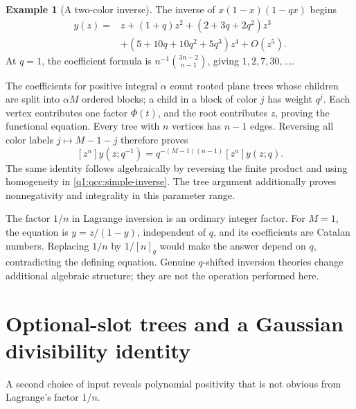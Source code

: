 \documentclass[11pt,a4paper,oneside,openany]{book}
\theoremstyle{definition}
\newtheorem{example}[theorem]{Example}
\theoremstyle{remark}
\begin{document}
\begin{example}[A two-color inverse]\label{q1:qcc:inverse-example}
The inverse of \(x(1-x)(1-qx)\) begins
\begin{align*}
 y(z)={}&z+(1+q)z^2+(2+3q+2q^2)z^3\\
       &+(5+10q+10q^2+5q^3)z^4+O(z^5).
\end{align*}
At \(q=1\), the coefficient formula is
\(n^{-1}\binom{3n-2}{n-1}\), giving \(1,2,7,30,\ldots\).
\end{example}
The coefficients for positive integral \(\alpha\) count rooted plane trees
whose children are split into \(\alpha M\) ordered blocks; a child in a block of
color \(j\) has weight \(q^j\). Each vertex contributes one factor
\(\Phi(t)\), and the root contributes \(z\), proving the functional equation.
Every tree with \(n\) vertices has \(n-1\) edges. Reversing all color labels
\(j\mapsto M-1-j\) therefore proves
\begin{equation}\label{q1:qcc:inverse-reciprocity}
 [z^n]y(z;q^{-1})=q^{-(M-1)(n-1)}[z^n]y(z;q).
\end{equation}
The same identity follows algebraically by reversing the finite product and using
homogeneity in \eqref{q1:qcc:simple-inverse}. The tree argument additionally proves
nonnegativity and integrality in this parameter range.

\begin{auditbox}[title={Ordinary inversion is not obtained by replacing \(n\) with \([n]_q\)}]
The factor \(1/n\) in Lagrange inversion is an ordinary integer factor. For
\(M=1\), the equation is \(y=z/(1-y)\), independent of \(q\), and its
coefficients are Catalan numbers. Replacing \(1/n\) by \(1/[n]_q\) would make
the answer depend on \(q\), contradicting the defining equation. Genuine
\(q\)-shifted inversion theories change additional algebraic structure; they
are not the operation performed here.
\end{auditbox}
\section{Optional-slot trees and a Gaussian divisibility identity}
A second choice of input reveals polynomial positivity that is not
obvious from Lagrange's factor $1/n$.
\end{document}
